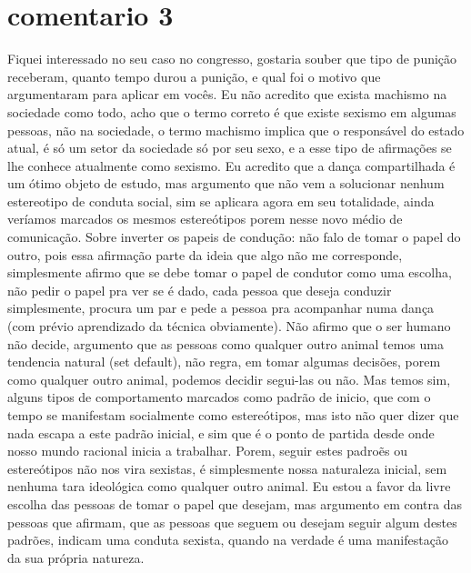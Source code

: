 \documentclass[a4paper,10pt]{article}
\begin{document}
\section{comentario 3}
Fiquei interessado no seu caso no congresso, gostaria souber que tipo de punição receberam, quanto tempo durou a punição, e qual foi o motivo que argumentaram para aplicar em vocês. Eu não acredito que exista machismo na sociedade como todo, acho que o termo correto é que existe sexismo em algumas pessoas, não na sociedade, o termo machismo implica que o responsável do estado atual, é só um setor da sociedade só por seu sexo, e a esse tipo de afirmações se lhe conhece atualmente como sexismo. Eu acredito que a dança compartilhada é um ótimo objeto de estudo, mas argumento que não vem a solucionar nenhum estereotipo de conduta social, sim se aplicara agora em seu totalidade, ainda veríamos marcados os mesmos estereótipos porem nesse novo médio de comunicação. Sobre inverter os papeis de condução: não falo de tomar o papel do outro, pois essa afirmação parte da ideia que algo não me corresponde, simplesmente afirmo que se debe tomar o papel de condutor como uma escolha, não pedir o papel pra ver se é dado, cada pessoa que deseja conduzir simplesmente, procura um par e pede a pessoa pra acompanhar numa dança (com prévio aprendizado da técnica obviamente). Não afirmo que o ser humano não decide, argumento que as pessoas como qualquer outro animal temos uma tendencia natural (set default), não regra, em tomar algumas decisões, porem como qualquer outro animal, podemos decidir segui-las ou não. Mas temos sim, alguns tipos de comportamento marcados como padrão de inicio, que com o tempo se manifestam socialmente como estereótipos, mas isto não quer dizer que nada escapa a este padrão inicial, e sim que é o ponto de partida desde onde nosso mundo racional inicia a trabalhar. Porem, seguir estes padroẽs ou estereótipos não nos vira sexistas, é simplesmente nossa naturaleza inicial, sem nenhuma tara ideológica como qualquer outro animal. Eu estou a favor da livre escolha das pessoas de tomar o papel que desejam, mas argumento em contra das pessoas que afirmam, que as pessoas que seguem ou desejam seguir algum destes padrões, indicam uma conduta sexista, quando na verdade é uma manifestação da sua própria natureza.﻿
\end{document}
